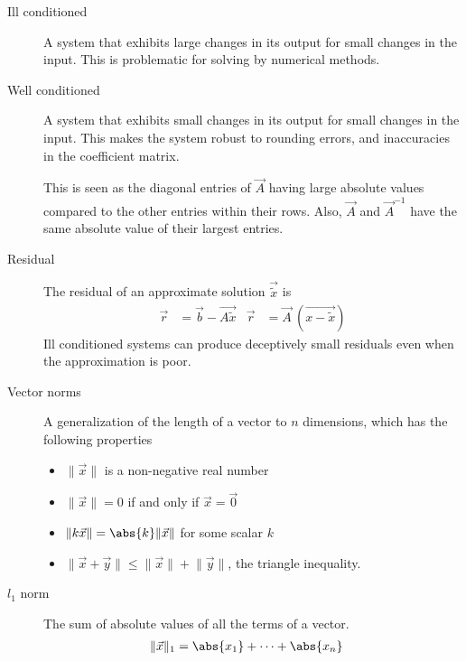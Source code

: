 \begin{description}
    \item[Ill conditioned] A system that exhibits large changes in its output for small
        changes in the input. This is problematic for solving by numerical methods.

    \item[Well conditioned] A system that exhibits small changes in its output for small
        changes in the input. This makes the system robust to rounding errors, and
        inaccuracies in the coefficient matrix. \par
        This is seen as the diagonal entries of $ \vec{A} $ having large absolute values
        compared to the other entries within their rows. Also, $ \vec{A} $ and
        $ \vec{A}^{-1} $ have the same absolute value of their largest entries.

    \item[Residual] The residual of an approximate solution $ \vec{\tilde{x}} $ is
        \begin{align}
            \vec{r} & = \vec{b} - \vec{A \tilde{x}}     &
            \vec{r} & = \vec{A}\ (\vec{x -  \tilde{x}})
        \end{align}
        Ill conditioned systems can produce deceptively small residuals even when the
        approximation is poor.

    \item[Vector norms] A generalization of the length of a vector to $ n $ dimensions,
        which has the following properties
        \begin{itemize}
            \item $ \lVert \vec{x} \rVert $ is a non-negative real number
            \item $ \lVert \vec{x} \rVert = 0 $ if and only if $ \vec{x} = \vec{0} $
            \item $ \lVert k\vec{x} \rVert  = \abs{k} \lVert \vec{x} \rVert $
                  for some scalar $ k $
            \item $ \lVert \vec{x} + \vec{y} \rVert \leq
                      \lVert \vec{x} \rVert + \lVert \vec{y} \rVert $, the triangle
                  inequality.
        \end{itemize}

    \item[$ l_1 $ norm] The sum of absolute values of all the terms of a vector.
        \begin{align}
            \lVert \vec{x} \rVert_1 & = \abs{x_1} + \dots + \abs{x_n}
        \end{align}


\end{description}
